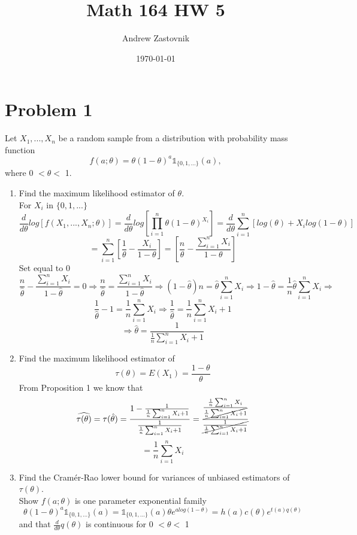 \documentclass[a4paper]{article}
\title{\vspace{-10ex}Math 164 HW 5}
\author{Andrew Zastovnik}
\date{\today}
\begin{document}
\maketitle

\section*{Problem 1}
	Let $X_1, . . . , X_n$ be a random sample from a distribution with probability mass function
\[ f(a; \theta) = \theta (1-\theta)^{a} \mathds{1}_{\{0,1,... \}}(a),\]
where 0 $< \theta < $ 1.
	\begin{enumerate}[label=(\alph*)]
		\item Find the maximum likelihood estimator of $\theta$.\\
		For $X_i$ in ${\{0,1,... \}}$
		\[\frac{d}{d \theta} log[f(X_1,...,X_n;\theta)] = 
		\frac{d}{d \theta} log[\prod_{i=1}^{n} \theta (1-\theta)^{X_i}]
		= \frac{d}{d \theta} \sum_{i=1}^{n}[ log(\theta)+ {X_i}log(1-\theta)]
		\] \[
		=\sum_{i=1}^{n}[ \frac{1}{\theta}- \frac{X_i}{1-\theta}]
		= [ \frac{n}{\theta}- \frac{\sum_{i=1}^{n}X_i}{1-\theta}]
		\]
		Set equal to 0
		\[
		\frac{n}{\hat{\theta}}- \frac{\sum_{i=1}^{n}X_i}{1-\hat{\theta}} = 0 \Rightarrow
		\frac{n}{\hat{\theta}} = \frac{\sum_{i=1}^{n}X_i}{1-\hat{\theta}} \Rightarrow
		(1-\hat{\theta})n = \hat{\theta}\sum_{i=1}^{n}X_i \Rightarrow
		1 - \hat{\theta} = \frac{1}{n}\hat{\theta}\sum_{i=1}^{n}X_i \Rightarrow\]\[
		\frac{1}{\hat{\theta}} - 1 = \frac{1}{n}\sum_{i=1}^{n}X_i \Rightarrow
		\frac{1}{\hat{\theta}} = \frac{1}{n}\sum_{i=1}^{n}X_i + 1 \]\[\Rightarrow
		\hat{\theta} = \frac{1}{\frac{1}{n}\sum_{i=1}^{n}X_i + 1}
		\]
		\item Find the maximum likelihood estimator of \[\tau(\theta) = E(X_1) = \frac{1-\theta}{\theta}\]
		From Proposition 1 we know that 
		\[ 
		\widehat{\tau(\theta)} = \tau(\hat{\theta}) = \frac{1-\frac{1}{\frac{1}{n}\sum_{i=1}^{n}X_i + 1}}{\frac{1}{\frac{1}{n}\sum_{i=1}^{n}X_i + 1}} = \frac{\frac{\frac{1}{n}\sum_{i=1}^{n}X_i}{\cancel{\frac{1}{n}\sum_{i=1}^{n}X_i + 1}}}{\cancel{\frac{1}{\frac{1}{n}\sum_{i=1}^{n}X_i + 1}}} 
		\]\[=\frac{1}{n}\sum_{i=1}^{n}X_i
		\]
		\item Find the Cramér-Rao lower bound for variances of unbiased estimators of $\tau(\theta)$.\\
		Show $f(a;\theta)$ is one parameter exponential family
		\[ 
		\theta (1-\theta)^{a} \mathds{1}_{\{0,1,... \}}(a)
		= \mathds{1}_{\{0,1,... \}}(a)\theta e^{alog(1-\theta)} 
		= h(a)c(\theta)e^{t(a)q(\theta)}
		\]
		and that $\frac{d}{d \theta}q(\theta)$ is continuous for 0 $< \theta < $ 1

\end{enumerate}
\end{document}
